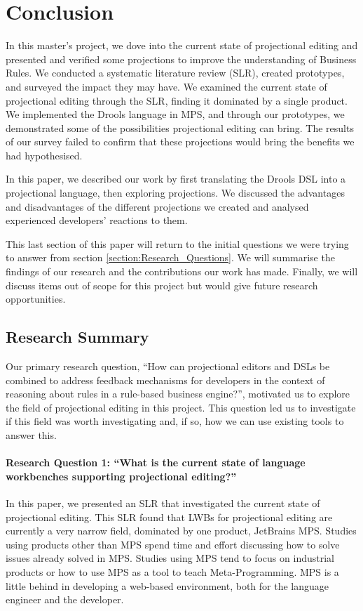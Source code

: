 \chapter{Conclusion}
\label{chapter:Conclusion}

In this master's project, we dove into the current state of projectional editing and presented and verified some projections to improve the understanding of Business Rules.
We conducted a systematic literature review (SLR), created prototypes, and surveyed the impact they may have.
We examined the current state of projectional editing through the SLR, finding it dominated by a single product.
We implemented the Drools language in MPS, and through our prototypes, we demonstrated some of the possibilities projectional editing can bring.
The results of our survey failed to confirm that these projections would bring the benefits we had hypothesised.

In this paper, we described our work by first translating the Drools DSL into a projectional language, then exploring projections.
We discussed the advantages and disadvantages of the different projections we created and analysed experienced developers' reactions to them.

This last section of this paper will return to the initial questions we were trying to answer from section \ref{section:Research_Questions}.
We will summarise the findings of our research and the contributions our work has made.
Finally, we will discuss items out of scope for this project but would give future research opportunities.

\section{Research Summary}
Our primary research question, ``How can projectional editors and DSLs be combined to address feedback mechanisms for developers in the context of reasoning about rules in a rule-based business engine?'', motivated us to explore the field of projectional editing in this project.
This question led us to investigate if this field was worth investigating and, if so, how we can use existing tools to answer this.

\subsubsection{Research Question 1: ``What is the current state of language workbenches supporting projectional editing?''}
In this paper, we presented an SLR that investigated the current state of projectional editing.
This SLR found that LWBs for projectional editing are currently a very narrow field, dominated by one product, JetBrains MPS.
Studies using products other than MPS spend time and effort discussing how to solve issues already solved in MPS.
Studies using MPS tend to focus on industrial products or how to use MPS as a tool to teach Meta-Programming.
MPS is a little behind in developing a web-based environment, both for the language engineer and the developer.

